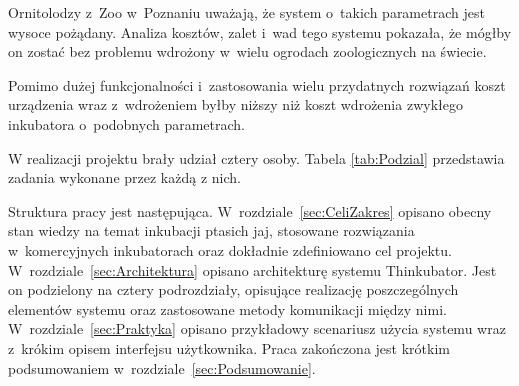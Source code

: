 Ornitolodzy z~Zoo w~Poznaniu uważają, że system o~takich parametrach jest
wysoce pożądany. Analiza kosztów, zalet i~wad tego systemu pokazała, że mógłby
on zostać bez problemu wdrożony w~wielu ogrodach zoologicznych na świecie.

Pomimo dużej funkcjonalności i~zastosowania wielu przydatnych rozwiązań koszt
urządzenia wraz z~wdrożeniem byłby niższy niż koszt wdrożenia zwykłego
inkubatora o~podobnych parametrach.

W realizacji projektu brały udział cztery osoby. Tabela \ref{tab:Podzial}
przedstawia zadania wykonane przez każdą z nich.

Struktura pracy jest następująca. W~rozdziale~\ref{sec:CeliZakres} opisano
obecny stan wiedzy na temat inkubacji ptasich jaj, stosowane rozwiązania
w~komercyjnych inkubatorach oraz dokładnie zdefiniowano cel projektu.
W~rozdziale~\ref{sec:Architektura} opisano architekturę systemu Thinkubator.
Jest on podzielony na cztery podrozdziały, opisujące realizację poszczególnych
elementów systemu oraz zastosowane metody komunikacji między nimi.
W~rozdziale~\ref{sec:Praktyka} opisano przykładowy scenariusz użycia systemu
wraz z~krókim opisem interfejsu użytkownika. Praca zakończona jest krótkim
podsumowaniem w~rozdziale~\ref{sec:Podsumowanie}.

